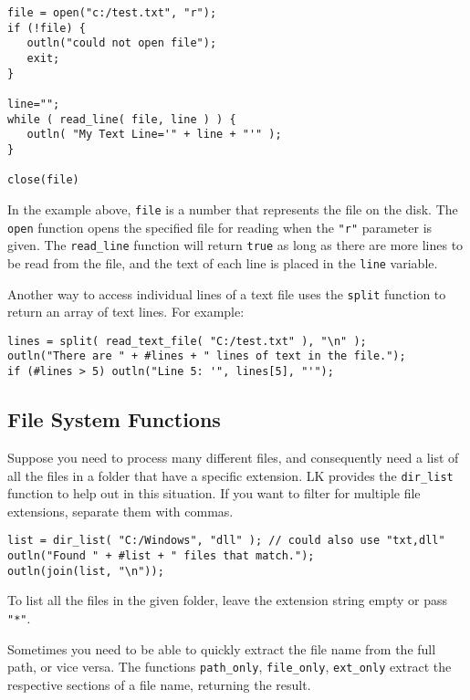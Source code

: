 \documentclass{article}
\begin{document}
\begin{verbatim}
file = open("c:/test.txt", "r");
if (!file) {
   outln("could not open file");
   exit;
}

line="";
while ( read_line( file, line ) ) {
   outln( "My Text Line='" + line + "'" );
}

close(file)
\end{verbatim}

In the example above, \texttt{file} is a number that represents the file on the disk.  The \texttt{open} function opens the specified file for reading when the \texttt{"r"} parameter is given.  The \texttt{read\_line} function will return \texttt{true} as long as there are more lines to be read from the file, and the text of each line is placed in the \texttt{line} variable.

Another way to access individual lines of a text file uses the \texttt{split} function to return an array of text lines.  For example:

\begin{verbatim}
lines = split( read_text_file( "C:/test.txt" ), "\n" );
outln("There are " + #lines + " lines of text in the file.");
if (#lines > 5) outln("Line 5: '", lines[5], "'");
\end{verbatim}

\subsection{File System Functions}

Suppose you need to process many different files, and consequently need a list of all the files in a folder that have a specific extension.  LK provides the \texttt{dir\_list} function to help out in this situation.  If you want to filter for multiple file extensions, separate them with commas.

\begin{verbatim}
list = dir_list( "C:/Windows", "dll" ); // could also use "txt,dll"
outln("Found " + #list + " files that match.");
outln(join(list, "\n"));
\end{verbatim}

To list all the files in the given folder, leave the extension string empty or pass \texttt{"*"}.

Sometimes you need to be able to quickly extract the file name from the full path, or vice versa.  The functions \texttt{path\_only}, \texttt{file\_only}, \texttt{ext\_only} extract the respective sections of a file name, returning the result.
\end{document}
